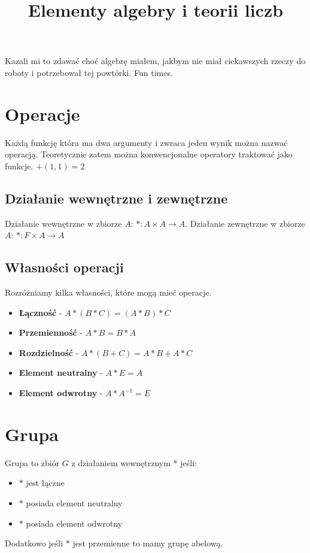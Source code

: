 \documentclass{../notatki}
\title{Elementy algebry i teorii liczb}
\begin{document}
\tableofcontents

\noindent Kazali mi to zdawać choć algebrę miałem, jakbym nie miał ciekawszych
rzeczy do roboty i potrzebował tej powtórki. Fun times.

\section{Operacje}

Każdą funkcję która ma dwa argumenty i zwraca jeden wynik można nazwać
operacją. Teoretycznie zatem można konwencjonalne operatory traktować jako
funkcje. $+(1, 1)=2$

\subsection{Działanie wewnętrzne i zewnętrzne}

Działanie wewnętrzne w zbiorze $A$: $*: A \times A \rightarrow A$.
Działanie zewnętrzne w zbiorze $A$: $*: F \times A \rightarrow A$

\subsection{Własności operacji}

Rozróżniamy kilka własności, które mogą mieć operacje.

\begin{itemize}
  \item \textbf{Łączność} - $A * (B * C) = (A * B) * C$
  \item \textbf{Przemienność} - $A * B = B * A$
  \item \textbf{Rozdzielność} - $A * (B + C) = A * B + A * C$
  \item \textbf{Element neutralny} - $A * E = A$
  \item \textbf{Element odwrotny} - $A * A^{-1} = E$
\end{itemize}

\section{Grupa}

Grupa to zbiór $G$ z działaniem wewnętrznym $*$ jeśli:
\begin{itemize}
  \item $*$ jest łączne
  \item $*$ posiada element neutralny
  \item $*$ posiada element odwrotny
\end{itemize}
Dodatkowo jeśli $*$ jest przemienne to mamy grupę abelową.
\end{document}
